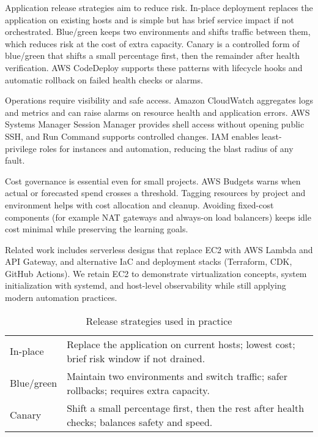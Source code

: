 \documentclass[12pt]{article}
\begin{document}
Application release strategies aim to reduce risk. In-place deployment replaces the application on existing hosts and is simple but has brief service impact if not orchestrated. Blue/green keeps two environments and shifts traffic between them, which reduces risk at the cost of extra capacity. Canary is a controlled form of blue/green that shifts a small percentage first, then the remainder after health verification. AWS CodeDeploy supports these patterns with lifecycle hooks and automatic rollback on failed health checks or alarms.

Operations require visibility and safe access. Amazon CloudWatch aggregates logs and metrics and can raise alarms on resource health and application errors. AWS Systems Manager Session Manager provides shell access without opening public SSH, and Run Command supports controlled changes. IAM enables least-privilege roles for instances and automation, reducing the blast radius of any fault.

Cost governance is essential even for small projects. AWS Budgets warns when actual or forecasted spend crosses a threshold. Tagging resources by project and environment helps with cost allocation and cleanup. Avoiding fixed-cost components (for example NAT gateways and always-on load balancers) keeps idle cost minimal while preserving the learning goals.

Related work includes serverless designs that replace EC2 with AWS Lambda and API Gateway, and alternative IaC and deployment stacks (Terraform, CDK, GitHub Actions). We retain EC2 to demonstrate virtualization concepts, system initialization with systemd, and host-level observability while still applying modern automation practices.

\begin{table}[h]
\centering
\caption{Release strategies used in practice}
\begin{tabular}{p{}p{}}
\hline
In-place & Replace the application on current hosts; lowest cost; brief risk window if not drained. \\
Blue/green & Maintain two environments and switch traffic; safer rollbacks; requires extra capacity. \\
Canary & Shift a small percentage first, then the rest after health checks; balances safety and speed. \\
\hline
\end{tabular}
\end{table}

\clearpage
\end{document}
